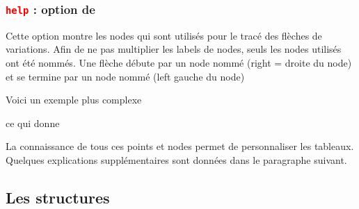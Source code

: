 \subsubsection{\texttt{\textcolor{red}{help}} :  option de } 
Cette option montre les nodes qui sont utilisés pour le tracé des flèches de variations. Afin de ne pas multiplier les labels de nodes, seuls les nodes utilisés ont été nommés. Une flèche débute par un node  nommé  (right = droite du node) et se termine par un node nommé  (left gauche du node)
\begin{tkzexample}[small]
\end{tkzexample}

Voici un exemple plus complexe

\begin{tkzexample}[small]
\end{tkzexample}

ce qui donne
\begin{tkzexample}[small]
\end{tkzexample} 

La connaissance de tous ces points et nodes permet de personnaliser les tableaux. Quelques explications supplémentaires sont données dans le paragraphe suivant.

\subsection{Les structures}
